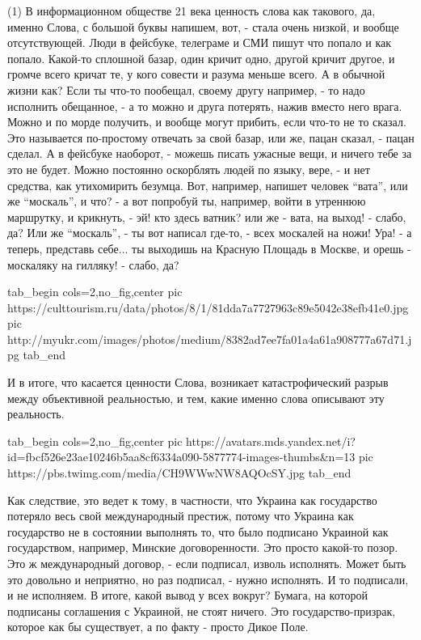 (1) В информационном обществе 21 века ценность слова как такового, да, именно
Слова, с большой буквы напишем, вот, - стала очень низкой, и вообще
отсутствующей. Люди в фейсбуке, телеграме и СМИ пишут что попало и как попало.
Какой-то сплошной базар, один кричит одно, другой кричит другое, и громче всего
кричат те, у кого совести и разума меньше всего.  А в обычной жизни как? Если
ты что-то пообещал, своему другу например, - то надо исполнить обещанное, - а
то можно и друга потерять, нажив вместо него врага. Можно и по морде получить,
и вообще могут прибить, если что-то не то сказал. Это называется по-простому
отвечать за свой базар, или же, пацан сказал, - пацан сделал. А в фейсбуке
наоборот, - можешь писать ужасные вещи, и ничего тебе за это не будет. Можно
постоянно оскорблять людей по языку, вере, - и нет средства, как утихомирить
безумца. Вот, например, напишет человек \enquote{вата}, или же
\enquote{москаль}, и что? - а вот попробуй ты, например, войти в утреннюю
маршрутку, и крикнуть, - эй! кто здесь ватник?  или же - вата, на выход! -
слабо, да? Или же \enquote{москаль}, - ты вот написал где-то, - всех москалей
на ножи! Ура! - а теперь, представь себе... ты выходишь на Красную Площадь в
Москве, и орешь - москаляку на гилляку! - слабо, да?

\ifcmt
  tab_begin cols=2,no_fig,center
     pic https://culttourism.ru/data/photos/8/1/81dda7a7727963c89e5042e38efb41e0.jpg
		 pic http://myukr.com/images/photos/medium/8382ad7ee7fa01a4a61a908777a67d71.jpg 
  tab_end
\fi

И в итоге, что касается ценности Слова, возникает катастрофический разрыв между
объективной реальностью, и тем, какие именно слова описывают эту реальность.

\ifcmt
  tab_begin cols=2,no_fig,center
     pic https://avatars.mds.yandex.net/i?id=fbcf526e23ae10246b5aa8cf6334a090-5877774-images-thumbs&n=13
		 pic https://pbs.twimg.com/media/CH9WWwNW8AQOcSY.jpg
	tab_end
\fi

Как следствие, это ведет к тому, в частности, что Украина как государство
потеряло весь свой международный престиж, потому что Украина как государство не
в состоянии выполнять то, что было подписано Украиной как государством,
например, Минские договоренности. Это просто какой-то позор. Это ж
международный договор, - если подписал, изволь исполнять.  Может быть это
довольно и неприятно, но раз подписал, - нужно исполнять. И то подписали, и не
исполняем. В итоге, какой вывод у всех вокруг? Бумага, на которой подписаны
соглашения с Украиной, не стоят ничего. Это государство-призрак, которое как бы
существует, а по факту - просто Дикое Поле.

